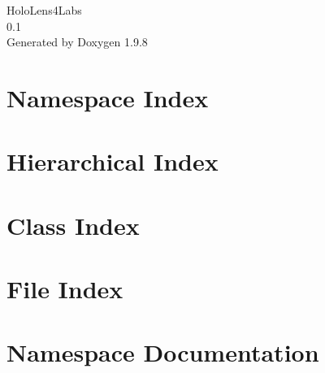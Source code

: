 \documentclass[twoside]{book}
\newcommand{\+}{\discretionary{\mbox{\scriptsize$\hookleftarrow$}}{}{}}
\newcommand{\clearemptydoublepage}{%
    \newpage{\pagestyle{empty}\cleardoublepage}%
  }
\begin{document}
  \raggedbottom
    \hypersetup{pageanchor=false,
                bookmarksnumbered=true,
                pdfencoding=unicode
               }
  \begin{titlepage}
  \vspace*{7cm}
  \begin{center}%
  {\Large Holo\+Lens4\+Labs}\\
  [1ex]\large 0.\+1 \\
  \vspace*{1cm}
  {\large Generated by Doxygen 1.9.8}\\
  \end{center}
  \end{titlepage}
  \clearemptydoublepage
  \tableofcontents
  \clearemptydoublepage
  \hypersetup{pageanchor=true}
\chapter{Namespace Index}

\chapter{Hierarchical Index}

\chapter{Class Index}

\chapter{File Index}

\chapter{Namespace Documentation}



















\end{document}
